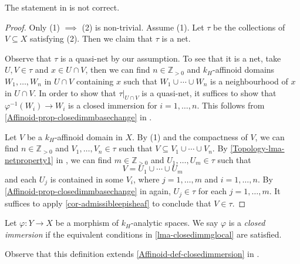 The statement in \cite[Lemma~1.3.7]{Berk93} is not correct.
\begin{proof}
    Only (1) $\implies$ (2) is non-trivial. Assume (1). Let $\tau$ be the collections of $V\subseteq X$ satisfying (2). Then we claim that $\tau$ is a net. 
    
    Observe that $\tau$ is a quasi-net by our assumption.
    To see that it is a net, take $U,V\in \tau$ and $x\in U\cap V$, then we can find $n\in \mathbb{Z}_{>0}$ and $k_H$-affinoid domains $W_1,\ldots,W_n$ in $U\cap V$ containing $x$ such that $W_1\cup\cdots\cup W_n$ is a neighbourhood of $x$ in $U\cap V$. In order to show that $\tau|_{U\cap V}$ is a quasi-net, it suffices to show that $\varphi^{-1}(W_i)\rightarrow W_i$ is a closed immersion for $i=1,\ldots,n$. This follows from \cref{Affinoid-prop-closedimmbasechange} in .

    Let $V$ be a $k_H$-affinoid domain in $X$.
    By (1) and the compactness of $V$, we can find $n\in \mathbb{Z}_{>0}$ and $V_1,\ldots,V_n\in \tau$ such that $V\subseteq V_1\cup\cdots\cup V_n$.
    By \cref{Topology-lma-netproperty1} in , we can find $m\in \mathbb{Z}_{>0}$ and $U_1,\ldots,U_m\in \tau$ such that
    \[
        V=U_1\cup\cdots\cup U_m  
    \]
    and each $U_j$ is contained in some $V_i$, where $j=1,\ldots,m$ and $i=1,\ldots,n$. By \cref{Affinoid-prop-closedimmbasechange} in  again, $U_j\in \tau$ for each $j=1,\ldots,m$. It suffices to apply \cref{cor-admissibleepisheaf} to conclude that $V\in \tau$.
\end{proof}

\begin{definition}
    Let $\varphi:Y\rightarrow X$ be a morphism of $k_H$-analytic spaces.  We say $\varphi$ is a \emph{closed immersion} if the equivalent conditions in \cref{lma-closedimmglocal} are satisfied.
\end{definition}
Observe that this definition extends \cref{Affinoid-def-closedimmersion} in .


